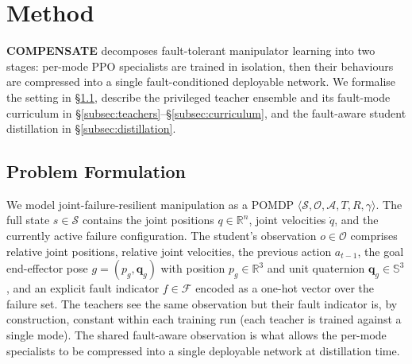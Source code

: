 \documentclass{article}
\begin{document}

\section{Method}
\label{sec:method}

	\textbf{COMPENSATE} decomposes fault-tolerant manipulator learning into two stages: per-mode
	PPO specialists are trained in isolation, then their behaviours are compressed into a single
	fault-conditioned deployable network. We formalise the setting in \S\ref{subsec:problem},
	describe the privileged teacher ensemble and its fault-mode curriculum in
	\S\ref{subsec:teachers}--\S\ref{subsec:curriculum}, and the fault-aware student distillation in
	\S\ref{subsec:distillation}.

	\subsection{Problem Formulation}
	\label{subsec:problem}

		We model joint-failure-resilient manipulation as a POMDP
		$\langle\mathcal{S},\mathcal{O},\mathcal{A},T,R,\gamma\rangle$. The full state
		$s\in\mathcal{S}$ contains the joint positions $q\in \mathbb{R}^n$, joint velocities $\dot q$, and the
		currently active failure configuration. The student's observation
		$o\in\mathcal{O}$ comprises relative joint positions, relative joint velocities, the previous
		action $a_{t-1}$, the goal end-effector pose $g=(p_g,\mathbf{q}_g)$ with position
		$p_g\in\mathbb{R}^{3}$ and unit quaternion $\mathbf{q}_g\in\mathbb{S}^{3}$, and an
		explicit fault indicator $f\in\mathcal{F}$ encoded as a one-hot vector over the failure
		set. The teachers see the same observation but their fault indicator is, by construction,
		constant within each training run (each teacher is trained against a single mode). The
		shared fault-aware observation is what allows the per-mode specialists to be compressed
		into a single deployable network at distillation time.
\end{document}
